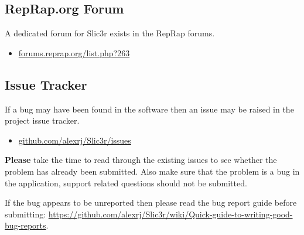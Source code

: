\subsection{RepRap.org Forum} %
\label{sub:reprap_org_forum}


A dedicated forum for Slic3r exists in the RepRap forums.
\begin{itemize}
    \item \url{forums.reprap.org/list.php?263}
\end{itemize}


\subsection{Issue Tracker} %
\label{sub:issue_tracker}

If a bug may have been found in the software then an issue may be raised in the project issue tracker.

\begin{itemize}
    \item \url{github.com/alexrj/Slic3r/issues}
\end{itemize}

\textbf{Please} take the time to read through the existing issues to see whether the problem has already been submitted.  Also make sure that the problem is a bug in the application, support related questions should not be submitted.

If the bug appears to be unreported then please read the bug report guide before submitting: \url{https://github.com/alexrj/Slic3r/wiki/Quick-guide-to-writing-good-bug-reports}.



